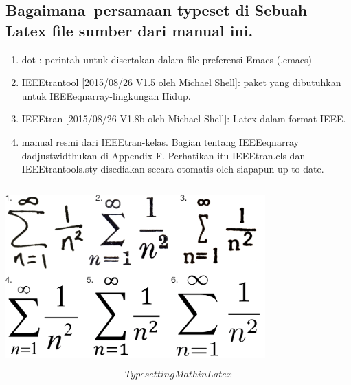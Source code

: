 \subsection{Bagaimana~persamaan typeset di  Sebuah Latex file sumber dari manual ini.}


\begin{enumerate}



\item  dot : perintah untuk disertakan dalam file preferensi Emacs (.emacs) 
\item IEEEtrantool [2015/08/26 V1.5 oleh Michael Shell]: paket yang dibutuhkan untuk IEEEeqnarray-lingkungan Hidup. 
\item IEEEtran [2015/08/26 V1.8b oleh Michael Shell]: Latex dalam format IEEE. 
\item  manual resmi dari IEEEtran-kelas. Bagian tentang IEEEeqnarray dadjustwidthukan di Appendix F. Perhatikan itu IEEEtran.cls dan IEEEtrantools.sty disediakan secara otomatis oleh siapapun up-to-date.\

\end {enumerate}

\includegraphics[width=10cm,height=7cm]{gambar/dapi12.jpg}
\begin{equation}Typesetting Math in Latex \end{equation}


